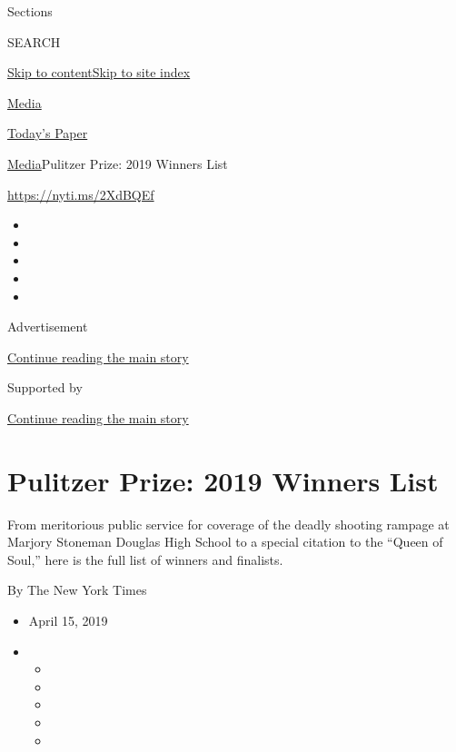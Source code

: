 Sections

SEARCH

\protect\hyperlink{site-content}{Skip to
content}\protect\hyperlink{site-index}{Skip to site index}

\href{https://www.nytimes3xbfgragh.onion/section/business/media}{Media}

\href{https://myaccount.nytimes3xbfgragh.onion/auth/login?response_type=cookie\&client_id=vi}{}

\href{https://www.nytimes3xbfgragh.onion/section/todayspaper}{Today's
Paper}

\href{/section/business/media}{Media}\textbar{}Pulitzer Prize: 2019
Winners List

\url{https://nyti.ms/2XdBQEf}

\begin{itemize}
\item
\item
\item
\item
\item
\end{itemize}

Advertisement

\protect\hyperlink{after-top}{Continue reading the main story}

Supported by

\protect\hyperlink{after-sponsor}{Continue reading the main story}

\hypertarget{pulitzer-prize-2019-winners-list}{%
\section{Pulitzer Prize: 2019 Winners
List}\label{pulitzer-prize-2019-winners-list}}

From meritorious public service for coverage of the deadly shooting
rampage at Marjory Stoneman Douglas High School to a special citation to
the ``Queen of Soul,'' here is the full list of winners and finalists.

By The New York Times

\begin{itemize}
\item
  April 15, 2019
\item
  \begin{itemize}
  \item
  \item
  \item
  \item
  \item
  \end{itemize}
\end{itemize}

